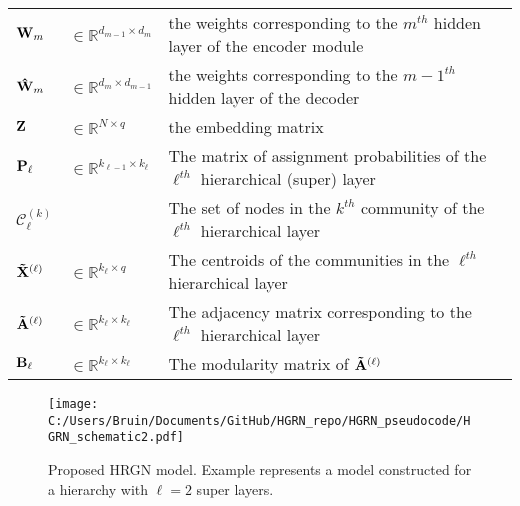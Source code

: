 \documentclass[a4paper,12pt]{article}
\begin{document}
\begin{table}[!ht]
\begin{tabular}{p{2cm}|p{3cm}|p{10cm}}
		${\bf W}_{m}$ & $\in \mathbb{R}^{d_{m-1}\times d_{m}}$ & the weights corresponding to the ${m}^{th}$ hidden layer of the encoder module \\
		
		${\bf \hat{W}}_{m}$ & $\in \mathbb{R}^{d_{m}\times d_{m-1}}$ & the weights corresponding to the ${m-1}^{th}$ hidden layer of the decoder \\
		
		${\bf Z}$ & $\in\mathbb{R}^{N \times q}$ & the embedding matrix \\
		
		${\bf P}_\ell$ & $\in\mathbb{R}^{k_{\ell-1} \times k_\ell}$ & The matrix of assignment probabilities of the $\ell^{th}$ hierarchical (super) layer \\
		
		$\mathcal{C}_\ell^{(k)}$ &  & The set of nodes in the $k^{th}$ community of the $\ell^{th}$ hierarchical layer \\
		
		${\bf \tilde X}^{(\ell)}$ & $\in\mathbb{R}^{k_\ell \times q}$& The centroids of the communities in the $\ell^{th}$ hierarchical layer \\
		
		${\bf \tilde A}^{(\ell)}$ & $\in\mathbb{R}^{k_\ell \times k_\ell}$& The adjacency matrix corresponding to the $\ell^{th}$ hierarchical layer \\
		
		${\bf B}_\ell$ & $\in\mathbb{R}^{k_\ell \times k_\ell}$ & The modularity matrix of ${\bf \tilde A}^{(\ell)}$ \\
		
		\bottomrule[0.08cm]
	\end{tabular}
\end{table}

\newpage

\begin{figure}
	\caption{Proposed HRGN model. Example represents a model constructed for a hierarchy with $\ell = 2$ super layers.}
	\texttt{[image: C:/Users/Bruin/Documents/GitHub/HGRN\_repo/HGRN\_pseudocode/HGRN\_schematic2.pdf]}
\end{figure}
	
	
	
	
	
	
	
	
	
	
	
	
	
	
	
	
	
	
	
	
	
	
	
	
	
	
	
	
	
	
	
	
	
	
	
	\clearpage
	\newpage
	
	
	
	
	
	
	
	
	
\end{document}
